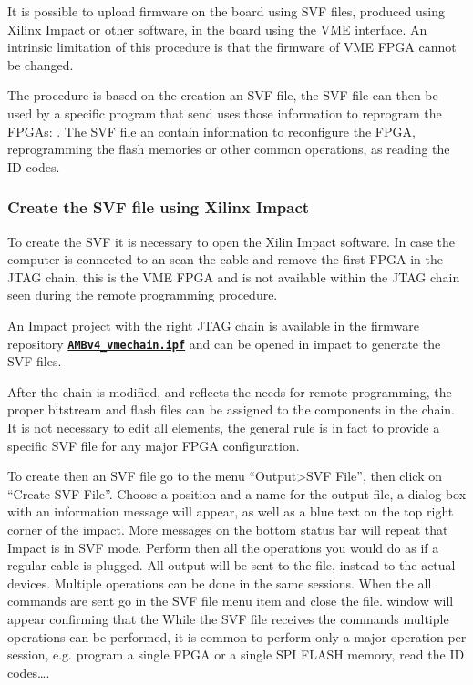 It is possible to upload firmware on the board using SVF files,
produced using Xilinx Impact or other software, in the board
using the VME interface. An intrinsic limitation of this procedure is
that the firmware of VME FPGA cannot be changed.

The procedure is based on the creation an SVF file, the SVF file can then
be used by a specific program that send uses those information to reprogram
the FPGAs: \texttt{}. The SVF file an contain information
to reconfigure the FPGA, reprogramming the flash memories or other
common operations, as reading the ID codes.

\subsubsection{Create the SVF file using Xilinx Impact}
To create the SVF it is necessary to open the Xilin Impact software. In case
the computer is connected to an \AMBoard scan the cable and remove the 
first FPGA in the JTAG chain, this is the VME FPGA and is not available
within the JTAG chain seen during the remote programming procedure.

An Impact project with the right JTAG chain is available in the firmware
repository \href{https://svnweb.cern.ch/trac/atlasftkfw/browser/AMboard/trunk/AMBSLP/AMBv4_vmechain.ipf}{\texttt{\textbf{AMBv4\_vmechain.ipf}}} and can be opened in impact to generate the SVF
files.

After the chain is modified, and reflects the needs for remote programming,
the proper bitstream and flash files can be assigned to the components in the
chain. It is not necessary to edit all elements, the general rule is in fact to
provide a specific SVF file for any major FPGA configuration.

To create then an SVF file go to the menu 
``Output>SVF File'', then click on ``Create SVF File''. Choose a position and
a name for the output file, a dialog box with an information message will appear,
as well as a blue text on the top right corner of the impact. More messages on the bottom
status bar will repeat that Impact is in SVF mode. Perform then all the operations
you would do as if a regular cable is plugged. All output will be sent to the file,
instead to the actual devices. Multiple operations can be done in the same sessions.
When the all commands are sent go in the SVF file menu item and close the file.
window will appear confirming that the 
While the SVF file receives the commands multiple operations can be performed,
it is common to perform only a major operation per session, e.g. program a single
FPGA or a single SPI FLASH memory, read the ID codes\ldots.


